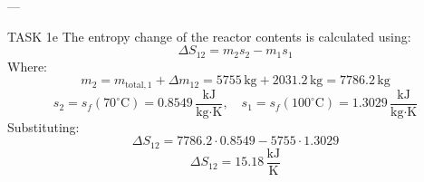 ---

TASK 1e  
The entropy change of the reactor contents is calculated using:  
\[
\Delta S_{12} = m_2 s_2 - m_1 s_1
\]  
Where:  
\[
m_2 = m_{\text{total},1} + \Delta m_{12} = 5755 \, \text{kg} + 2031.2 \, \text{kg} = 7786.2 \, \text{kg}
\]  
\[
s_2 = s_f(70^\circ\text{C}) = 0.8549 \, \frac{\text{kJ}}{\text{kg·K}}, \quad s_1 = s_f(100^\circ\text{C}) = 1.3029 \, \frac{\text{kJ}}{\text{kg·K}}
\]  
Substituting:  
\[
\Delta S_{12} = 7786.2 \cdot 0.8549 - 5755 \cdot 1.3029
\]  
\[
\Delta S_{12} = 15.18 \, \frac{\text{kJ}}{\text{K}}
\]  